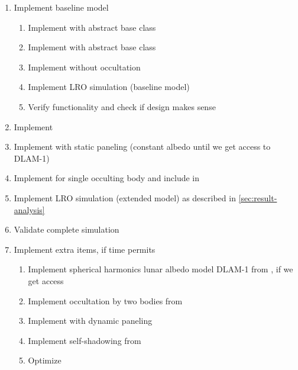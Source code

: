 \documentclass[parskip=full,DIV=15]{scrartcl}
\begin{document}
\begin{enumerate}
   \item Implement baseline model
   \begin{enumerate}
      \item Implement  with abstract base class
      \item Implement  with abstract base class
      \item Implement  without occultation
      \item Implement LRO simulation (baseline model)
      \item Verify functionality and check if design makes sense
   \end{enumerate}
   \item Implement  
   \item Implement  with static paneling (constant albedo until we get access to DLAM-1)
   \item Implement  for single occulting body and include in \\ 
   \item Implement LRO simulation (extended model) as described in \cref{sec:result-analysis}
   \item Validate complete simulation
   \item Implement extra items, if time permits
   \begin{enumerate}
      \item Implement spherical harmonics lunar albedo model DLAM-1 from \textcite{Floberghagen1999}, if we get access
      \item Implement occultation by two bodies from \textcite{Zhang2019}
      \item Implement  with dynamic paneling
      \item Implement self-shadowing from \textcite{Mazarico2009}
      \item Optimize
   \end{enumerate}
\end{enumerate}







\printbibliography
\end{document}
